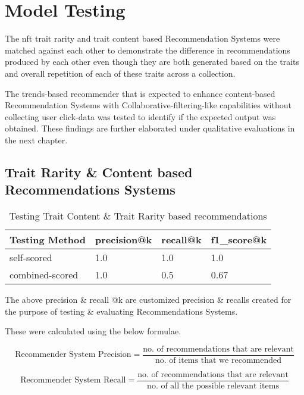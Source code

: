 \section{Model Testing}
The \gls{nft} trait rarity and trait content based Recommendation Systems were matched against each other to demonstrate the difference in recommendations produced by each other even though they are both generated based on the traits and overall repetition of each of these traits across a collection.

The trends-based recommender that is expected to enhance content-based Recommendation Systems with Collaborative-filtering-like capabilities without collecting user click-data was tested to identify if the expected output was obtained. These findings are further elaborated under qualitative evaluations in the next chapter.

\subsection{Trait Rarity \& Content based Recommendations Systems}


\vspace{-4mm}
\begin{table}[h!]
\centering
\caption{Testing Trait Content \& Trait Rarity based recommendations}
\begin{tabular}{|l|l|l|l|}
\hline
\textbf{Testing Method} & \textbf{precision@k} &
\textbf{recall@k} & \textbf{f1\_score@k} \\
\hline
self-scored & 1.0 & 1.0 & 1.0 \\
\hline
combined-scored & 1.0 & 0.5 & 0.67\\
\hline
\end{tabular}
\end{table}

The above precision \& recall @k are customized precision \& recalls created for the purpose of testing \& evaluating Recommendations Systems.

These were calculated using the below formulae.

\[\text{Recommender System Precision} = \frac{\text{no. of recommendations that are relevant}}{\text{no. of items that we recommended}}\]

\[\text{Recommender System Recall} = \frac{\text{no. of recommendations that are relevant}}{\text{no. of all the possible relevant items}}\]

